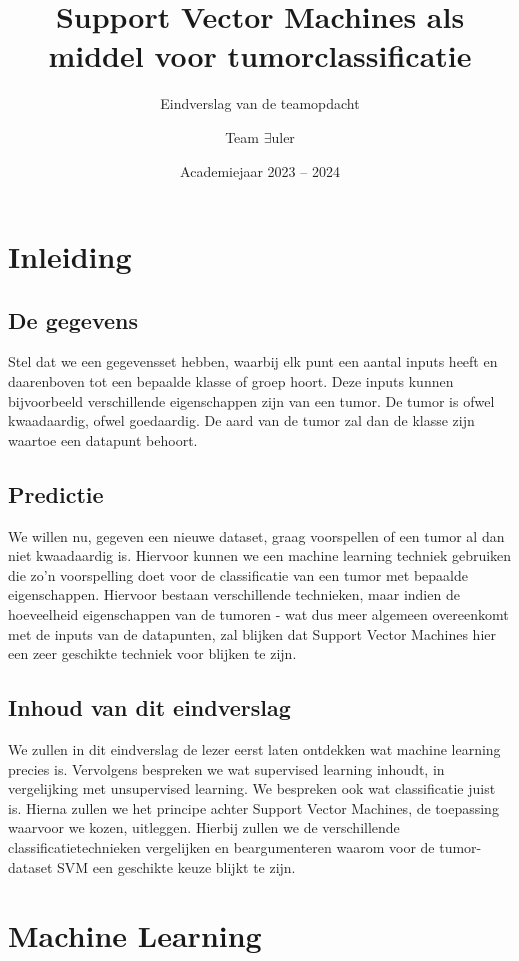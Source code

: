 \documentclass[twoside, kulak]{kulakreport}
\title{Support Vector Machines als \\middel voor tumorclassificatie}
\subtitle{Eindverslag van de teamopdacht}
\author{Team $\exists$uler}
\date{Academiejaar 2023 -- 2024}
\institute{Vincent Van Schependom, Daan Vanhaverbeke, Jasper Benoit, Lasha Shergelashvili, Marie Taillieu, Zeineb Kharbach Florian	Degraeve, \\Younes Mebarki}
\begin{document}
\titlepage

\tableofcontents

\chapter*{Inleiding}

\section*{De gegevens}

Stel dat we een gegevensset hebben, waarbij elk punt een aantal inputs heeft en daarenboven tot een bepaalde klasse of groep hoort. Deze inputs kunnen bijvoorbeeld verschillende eigenschappen zijn van een tumor. De tumor is ofwel kwaadaardig, ofwel goedaardig. De aard van de tumor zal dan de klasse zijn waartoe een datapunt behoort.

\section*{Predictie}

We willen nu, gegeven een nieuwe dataset, graag voorspellen of een tumor al dan niet kwaadaardig is. Hiervoor kunnen we een machine learning techniek gebruiken die zo'n voorspelling doet voor de classificatie van een tumor met bepaalde eigenschappen. Hiervoor bestaan verschillende technieken, maar indien de hoeveelheid eigenschappen van de tumoren - wat dus meer algemeen overeenkomt met de inputs van de datapunten, zal blijken dat Support Vector Machines hier een zeer geschikte techniek voor blijken te zijn.

\section*{Inhoud van dit eindverslag}

We zullen in dit eindverslag de lezer eerst laten ontdekken wat machine learning precies is. Vervolgens bespreken we wat supervised learning inhoudt, in vergelijking met unsupervised learning. We bespreken ook wat classificatie juist is. Hierna zullen we het principe achter Support Vector Machines, de toepassing waarvoor we kozen, uitleggen. Hierbij zullen we de verschillende classificatietechnieken vergelijken en beargumenteren waarom voor de tumor-dataset SVM een geschikte keuze blijkt te zijn.

\chapter{Machine Learning}
\end{document}
